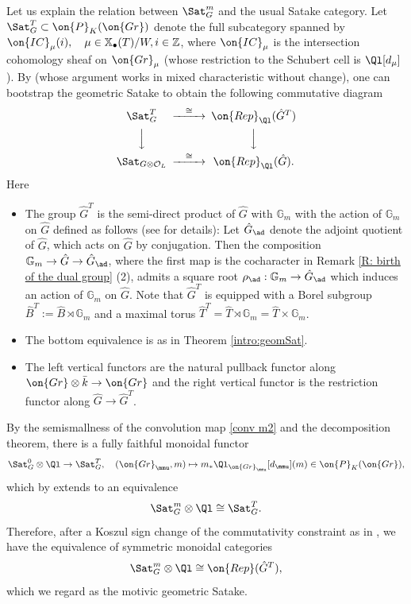 \documentclass[11pt]{amsart}
\theoremstyle{definition}
\theoremstyle{definition}
\theoremstyle{definition}
\numberwithin{equation}{subsection}
\newcommand{\bG}{{\mathbb G}}
\newcommand{\bZ}{{\mathbb Z}}
\newcommand{\mO}{{\mathcal O}}
\newcommand{\Gr}{{\on{Gr}}}
\def\xcoch{\mathbb{X}_\bullet}
\newcommand{\IC}{\on{IC}}
\begin{document}
Let us explain the relation between $\Sat_G^m$ and the usual Satake category. 
Let $\Sat^T_G\subset \on{P}_K(\Gr)$ denote the full subcategory spanned by $\IC_\mu(i),\quad \mu\in\xcoch(T)/W,i\in\bZ$, where $\IC_\mu$ is the intersection cohomology sheaf on $\Gr_\mu$ (whose restriction to the Schubert cell is $\Ql[d_\mu]$). By  \cite[Lemma 5.5.14]{Zh2} (whose argument works in mixed characteristic without change), one can bootstrap the geometric Satake to obtain the following commutative diagram
\[
\begin{CD}
\Sat^T_G@>\cong>>\on{Rep}_{\Ql}(\hat G^T)\\
@VVV@VVV\\
\Sat_{G\otimes\mO_L}@>\cong>>\on{Rep}_{\Ql}(\hat G).
\end{CD}
\]
Here 
\begin{itemize}
\item The group $\hat{G}^T$ is the semi-direct product of $\hat{G}$ with $\bG_m$ with the action of $\bG_m$ on $\hat G$ defined as follows (see \cite[(5.5.10)]{Zh2} for details): Let $\hat G_\ad$ denote the adjoint quotient of $\hat G$, which acts on $\hat G$ by conjugation. Then the composition $\bG_m\to \hat G\to\hat G_\ad$, where the first map is the cocharacter in Remark \ref{R: birth of the dual group} (2), admits a square root $\rho_\ad:\bG_m\to \hat G_\ad$ which induces an action of $\bG_m$ on $\hat G$. Note that $\hat G^T$ is equipped with a Borel subgroup $\hat B^T:=\hat B\rtimes\bG_m$ and a maximal torus $\hat T^T=\hat T\rtimes \bG_m=\hat T\times \bG_m$.
\item The bottom equivalence is as in Theorem \ref{intro:geomSat}.
\item The left vertical functors are the natural pullback functor along $\Gr\otimes\bar k \to \Gr$ and the right vertical functor is the restriction functor along $\hat G\to \hat G^T$.
\end{itemize}


By the semismallness of the convolution map \eqref{conv m2} and the decomposition theorem, there is a fully faithful monoidal functor 
$$\Sat_G^0\otimes\Ql\to \Sat_G^T,\quad (\Gr_{\mmu},m)\mapsto m_*\Ql_{\Gr_{\mmu}}[d_{\mmu}](m)\in \on{P}_K(\Gr),$$  which by \cite[Lemma 2.16]{Zh1} extends to an equivalence 
$$\Sat^m_G\otimes\Ql\cong \Sat^T_G.$$ 
Therefore, after a Koszul sign change of the commutativity constraint as in \cite[(2.4.4)]{Zh1}, we have the equivalence of symmetric monoidal categories
\begin{equation*}
\label{E:geom sat Tate}
\Sat^m_G\otimes\Ql\cong \on{Rep}(\hat{G}^T),
\end{equation*}
which we regard as the motivic geometric Satake.
\end{document}
